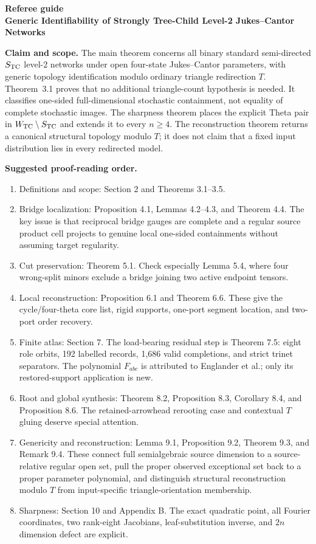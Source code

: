 \documentclass[10pt]{article}
\begin{document}
\begin{center}
{\Large\bf Referee guide}\\[2pt]
{\bf Generic Identifiability of Strongly Tree-Child Level-2 Jukes--Cantor Networks}
\end{center}

\textbf{Claim and scope.}  The main theorem concerns all binary standard semi-directed $S_{\rm TC}$ level-2 networks under open four-state Jukes--Cantor parameters, with generic topology identification modulo ordinary triangle redirection $T$.  Theorem~3.1 proves that no additional triangle-count hypothesis is needed.  It classifies one-sided full-dimensional stochastic containment, not equality of complete stochastic images.  The sharpness theorem places the explicit Theta pair in $W_{\rm TC}\setminus S_{\rm TC}$ and extends it to every $n\ge4$.  The reconstruction theorem returns a canonical structural topology modulo $T$; it does not claim that a fixed input distribution lies in every redirected model.

\textbf{Suggested proof-reading order.}
\begin{enumerate}
\item Definitions and scope: Section 2 and Theorems 3.1--3.5.
\item Bridge localization: Proposition 4.1, Lemmas 4.2--4.3, and Theorem 4.4.  The key issue is that reciprocal bridge gauges are complete and a regular source product cell projects to genuine local one-sided containments without assuming target regularity.
\item Cut preservation: Theorem 5.1.  Check especially Lemma 5.4, where four wrong-split minors exclude a bridge joining two active endpoint tensors.
\item Local reconstruction: Proposition 6.1 and Theorem 6.6.  These give the cycle/four-theta core list, rigid supports, one-port segment location, and two-port order recovery.
\item Finite atlas: Section 7.  The load-bearing residual step is Theorem 7.5: eight role orbits, 192 labelled records, 1,686 valid completions, and strict trinet separators.  The polynomial $F_{abc}$ is attributed to Englander et al.; only its restored-support application is new.
\item Root and global synthesis: Theorem 8.2, Proposition 8.3, Corollary 8.4, and Proposition 8.6.  The retained-arrowhead rerooting case and contextual $T$ gluing deserve special attention.
\item Genericity and reconstruction: Lemma 9.1, Proposition 9.2, Theorem 9.3, and Remark 9.4.  These connect full semialgebraic source dimension to a source-relative regular open set, pull the proper observed exceptional set back to a proper parameter polynomial, and distinguish structural reconstruction modulo $T$ from input-specific triangle-orientation membership.
\item Sharpness: Section 10 and Appendix B.  The exact quadratic point, all Fourier coordinates, two rank-eight Jacobians, leaf-substitution inverse, and $2n$ dimension defect are explicit.
\end{enumerate}
\end{document}
